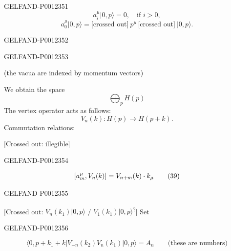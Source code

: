 \begin{GelfandAdjacentEvidence}{GELFAND-P001235}{1}
\begin{equation*}
a_i^\mu|0,p\rangle=0,\quad\text{if }i>0,
\tag*{$(36)_i$}
\end{equation*}
\begin{equation*}
a_0^\mu|0,p\rangle=
\text{[crossed out]}\ p^\mu\,\text{[crossed out]}\ |0,p\rangle.
\tag*{$(36)_0$}
\end{equation*}
\end{GelfandAdjacentEvidence}
\begin{GelfandAdjacentEvidence}{GELFAND-P001235}{2}

\end{GelfandAdjacentEvidence}
\begin{GelfandAdjacentEvidence}{GELFAND-P001235}{3}

(the vacua are indexed by momentum vectors)

We obtain the space
\begin{equation*}
\bigoplus_p H(p)
\tag{37}
\end{equation*}
The vertex operator acts as follows:
\begin{equation*}
V_n(k):H(p)\longrightarrow H(p+k).
\tag{38}
\end{equation*}
Commutation relations:

[Crossed out: illegible]
\end{GelfandAdjacentEvidence}
\begin{GelfandAdjacentEvidence}{GELFAND-P001235}{4}

\begin{equation*}
\relax [a_m^\mu,V_n(k)]=V_{n+m}(k)\cdot k_\mu
\tag{39}
\end{equation*}
\end{GelfandAdjacentEvidence}
\begin{GelfandAdjacentEvidence}{GELFAND-P001235}{5}


[Crossed out: $V_n(k_1)|0,p\rangle$ / $V_1(k_1)|0,p\rangle$\textsuperscript{?}] Set
\end{GelfandAdjacentEvidence}
\begin{GelfandAdjacentEvidence}{GELFAND-P001235}{6}

\begin{equation*}
\langle0,p+k_1+k|V_{-n}(k_2)V_n(k_1)|0,p\rangle=A_n\qquad\text{(these are numbers)}
\tag{40}
\end{equation*}
\end{GelfandAdjacentEvidence}


